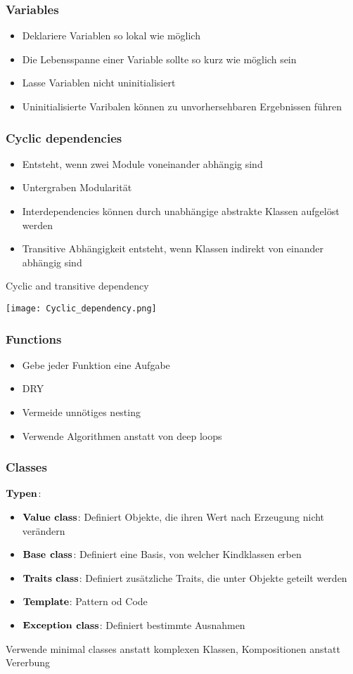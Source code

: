 \subsubsection{Variables}
\begin{itemize}
	\item Deklariere Variablen so lokal wie möglich
	\item Die Lebensspanne einer Variable sollte so kurz wie möglich sein
	\item Lasse Variablen nicht uninitialisiert
	\item Uninitialisierte Varibalen können zu unvorhersehbaren Ergebnissen führen  
\end{itemize}
\subsubsection{Cyclic dependencies}
\begin{itemize}
	\item Entsteht, wenn zwei Module voneinander abhängig sind
	\item Untergraben Modularität
	\item Interdependencies können durch unabhängige abstrakte Klassen aufgelöst werden
	\item Transitive Abhängigkeit entsteht, wenn Klassen indirekt von einander abhängig sind
\end{itemize}
\begin{table}[H]
\caption{Cyclic and transitive dependency}
\texttt{[image: Cyclic\_dependency.png]}	
\end{table}
\subsubsection{Functions}
\begin{itemize}
	\item Gebe jeder Funktion eine Aufgabe
	\item DRY
	\item Vermeide unnötiges nesting
	\item Verwende Algorithmen anstatt von deep loops
\end{itemize}
\subsubsection{Classes}
$\bold{Typen}$:
\begin{itemize}
	\item $\bold{Value}$ $\bold{class}$: Definiert Objekte, die ihren Wert nach Erzeugung nicht verändern
	\item $\bold{Base}$ $\bold{class}$: Definiert eine Basis, von welcher Kindklassen erben
	\item $\bold{Traits}$ $\bold{class}$: Definiert zusätzliche Traits, die unter Objekte geteilt werden
	\item $\bold{Template}$: Pattern od Code
	\item $\bold{Exception}$ $\bold{class}$: Definiert bestimmte Ausnahmen
\end{itemize}
Verwende minimal classes anstatt komplexen Klassen, Kompositionen anstatt Vererbung
